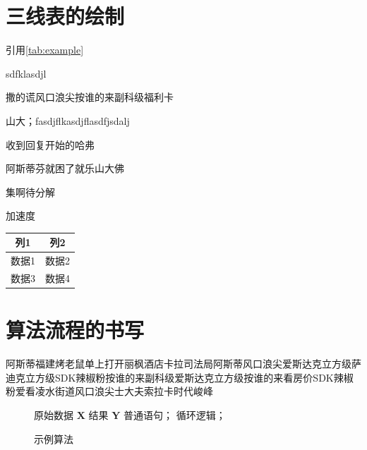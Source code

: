 \section{三线表的绘制}

引用\autoref{tab:example}

sdfklasdjl

撒的谎风口浪尖按谁的来副科级福利卡

山大；fasdjflkasdjflasdfjsdalj

收到回复开始的哈弗

阿斯蒂芬就困了就乐山大佛

集啊待分解

加速度


\begin{table}[h]
    \label{tab:example}
    \centering
    \vspace{-0.2cm}
    \wuhao\yingsong
    \begin{tabular}{cc}
        \hline
        列1 & 列2  \\
        \hline
        数据1 & 数据2 \\
        数据3 & 数据4 \\
        \hline
    \end{tabular}
\end{table}

\section{算法流程的书写}

阿斯蒂福建烤老鼠单上打开丽枫酒店卡拉司法局阿斯蒂风口浪尖爱斯达克立方级萨迪克立方级SDK辣椒粉按谁的来副科级爱斯达克立方级按谁的来看房价SDK辣椒粉爱看凌水街道风口浪尖士大夫索拉卡时代峻峰

\begin{figure}
    \centering
    \begin{minipage}{0.75\linewidth}
        \begin{algorithm}[H]
            \caption{示例算法}
            \label{alg-1}
            \begin{algorithmic}[1]
                \Require 原始数据 $\mathbf{X}$
                \Ensure 结果 $\mathbf{Y}$
                \State 普通语句；
                    \State 循环逻辑；
                \EndFor
            \end{algorithmic}
        \end{algorithm}
    \end{minipage}
\end{figure}

